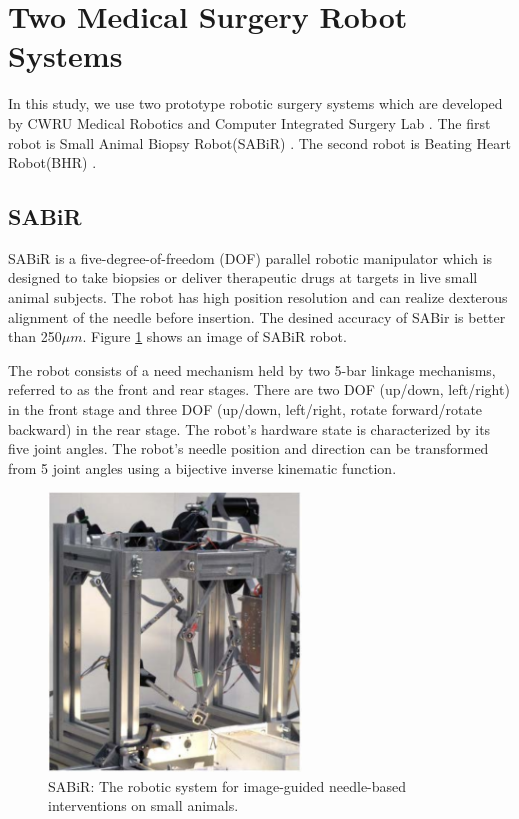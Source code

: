 \section{Two Medical Surgery Robot Systems }\label{secrobot}
In this study, we use two prototype robotic surgery systems which are developed by CWRU Medical Robotics and Computer Integrated Surgery Lab \cite{MeRCIS}. The first robot is Small Animal Biopsy Robot(SABiR) \cite{bebek2008design}. The second robot is Beating Heart Robot(BHR) \cite{bebek2007whisker, bebek2006model}.

\subsection {SABiR}
SABiR is a five-degree-of-freedom (DOF) parallel robotic manipulator which is designed to take biopsies or deliver therapeutic drugs at targets in live small animal subjects. The robot has high position resolution and can realize dexterous alignment of  the needle before insertion. The desined accuracy of SABir is better than 250${\mu}m$. Figure \ref{sabir} shows an image of SABiR robot. 

The robot consists of a need mechanism held by two 5-bar linkage mechanisms, referred to as the front and rear stages. There are two DOF (up/down, left/right) in the front stage and three DOF (up/down, left/right, rotate forward/rotate backward) in the rear stage. The robot’s hardware state is characterized by its five joint angles. The robot’s needle position and direction can be transformed from 5 joint angles using a bijective inverse kinematic function.

\begin{figure}[!thpb]
\centering
\includegraphics[width=0.6\textwidth]{chapter5_SABiR.pdf}
\caption{SABiR: The robotic system for image-guided needle-based interventions on small animals.}
\label{sabir}
\end{figure}

